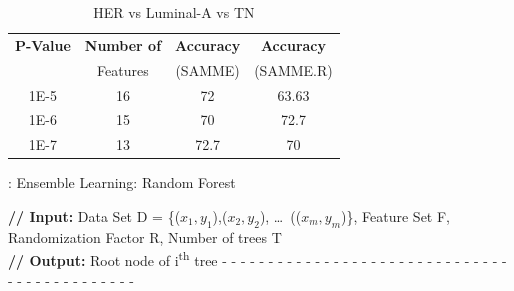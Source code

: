 \documentclass[final,1p,times,twocolumn]{elsarticle}
\begin{document}
\begin{table}[!b]
\scriptsize
\centering
\caption{HER vs Luminal-A vs TN}
\label{tb7}
\begin{tabular}{| c | c | c | c |}
\hline
\textbf{P-Value} & \textbf{Number of} & \textbf{Accuracy} & \textbf{Accuracy}\\
&Features&(SAMME)&(SAMME.R)\\
\hline
1E-5&16&72&63.63\\
\hline
1E-6&15&70&72.7\\
\hline
1E-7&13&72.7&70\\
\hline
\end{tabular}
\end{table}

\begin{algorithm}[!t]
\caption{: Ensemble Learning: Random Forest}\label{alg:rf}
\begin{algorithmic}[1]
\footnotesize
\STATE \textbf{// Input:} Data Set D = \{(\(x_1, y_1\)),(\(x_2, y_2\)), \dots\, ((\(x_m, y_m\))\}, Feature Set F, Randomization Factor R, Number of trees T 
\\\textbf{// Output:} Root node of i\textsuperscript{th} tree
\STATE - - - - - - - - - - - - - - - - - - - - - - - - - - - - - - - - - - - - - - - - - - - - -
\ENDIF
{}  
\ENDFOR
\ENDFOR
{}
\end{algorithmic}
\end{algorithm}
\end{document}
